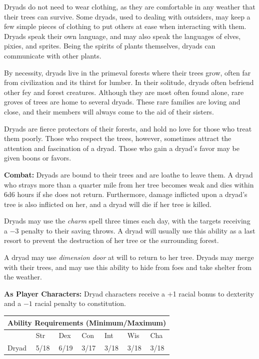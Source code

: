 \begin{multicols}{2}
Dryads do not need to wear clothing, as they are comfortable in any weather that their trees can survive. Some dryads, used to dealing with outsiders, may keep a few simple pieces of clothing to put others at ease when interacting with them. Dryads speak their own language, and may also speak the languages of elves, pixies, and sprites. Being the spirits of plants themselves, dryads can communicate with other plants.

By necessity, dryads live in the primeval forests where their trees grow, often far from civilization and its thirst for lumber. In their solitude, dryads often befriend other fey and forest creatures. Although they are most often found alone, rare groves of trees are home to several dryads. These rare families are loving and close, and their members will always come to the aid of their sisters.

Dryads are fierce protectors of their forests, and hold no love for those who treat them poorly. Those who respect the trees, however, sometimes attract the attention and fascination of a dryad. Those who gain a dryad's favor may be given boons or favors.

\textbf{Combat:} Dryads are bound to their trees and are loathe to leave them. A dryad who strays more than a quarter mile from her tree becomes weak and dies within 6d6 hours if she does not return. Furthermore, damage inflicted upon a dryad's tree is also inflicted on her, and a dryad will die if her tree is killed.

Dryads may use the \textit{charm} spell three times each day, with the targets receiving a $-3$ penalty to their saving throws. A dryad will usually use this ability as a last resort to prevent the destruction of her tree or the surrounding forest.

A dryad may use \textit{dimension door} at will to return to her tree. Dryads may merge with their trees, and may use this ability to hide from foes and take shelter from the weather.

\textbf{As Player Characters:} Dryad characters receive a +1 racial bonus to dexterity and a $-1$ racial penalty to constitution.

\noindent \begin{minipage}{\columnwidth}

\noindent \begin{tabular}{|p{}|p{}|p{}|p{}|p{}|p{}|p{}|}
\multicolumn{7}{c}{Ability Requirements (Minimum/Maximum)} \\
\hline
	& Str	& Dex	& Con	& Int	& Wis	& Cha	\\
\hline\hline
\rowcolor[gray]{.9}Dryad	& 5/18	& 6/19	& 3/17	& 3/18	& 3/18	& 3/18	\\
\hline
\end{tabular}


\end{minipage}
\end{multicols}
